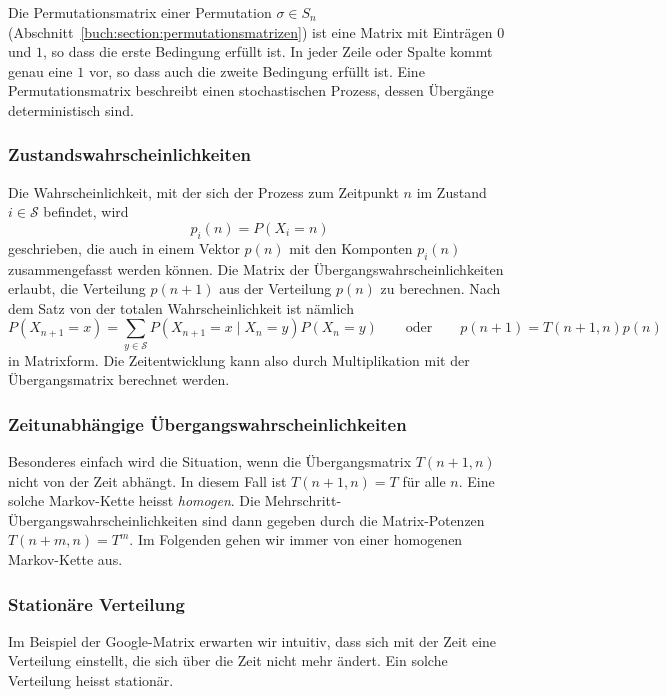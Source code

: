 \begin{beispiel}
Die Permutationsmatrix einer Permutation $\sigma\in S_n$ 
(Abschnitt~\ref{buch:section:permutationsmatrizen})
%
ist eine Matrix mit Einträgen $0$ und $1$, so dass die erste Bedingung
erfüllt ist.
In jeder Zeile oder Spalte kommt genau eine $1$ vor, so dass auch die
zweite Bedingung erfüllt ist.
Eine Permutationsmatrix beschreibt einen stochastischen Prozess, dessen
Übergänge deterministisch sind.
\end{beispiel}

\subsubsection{Zustandswahrscheinlichkeiten}
Die Wahrscheinlichkeit, mit der sich der Prozess zum Zeitpunkt $n$
im Zustand $i\in\mathcal{S}$ befindet, wird
\[
p_i(n)
=
P(X_i=n)
\]
geschrieben, die auch in einem Vektor $p(n)$ mit den Komponten
$p_i(n)$ zusammengefasst werden können.
Die Matrix der Übergangswahrscheinlichkeiten erlaubt, die Verteilung
$p(n+1)$ aus der Verteilung $p(n)$ zu berechnen.
Nach dem Satz von der totalen Wahrscheinlichkeit ist nämlich
\[
P(X_{n+1}=x)
=
\sum_{y\in\mathcal{S}} 
P(X_{n+1}=x\mid X_n=y) P(X_n=y)
\qquad\text{oder}\qquad
p(n+1) = T(n+1,n) p(n)
\]
in Matrixform.
Die Zeitentwicklung kann also durch Multiplikation mit der Übergangsmatrix
berechnet werden.

\subsubsection{Zeitunabhängige Übergangswahrscheinlichkeiten}
Besonderes einfach wird die Situation, wenn die Übergangsmatrix $T(n+1,n)$
nicht von der Zeit abhängt.
In diesem Fall ist $T(n+1,n) = T$ für alle $n$.
Eine solche Markov-Kette heisst {\em homogen}.
%
Die Mehrschritt-Übergangswahrscheinlichkeiten sind dann gegeben
durch die Matrix-Potenzen $T(n+m,n)=T^m$.
Im Folgenden gehen wir immer von einer homogenen Markov-Kette aus.

\subsubsection{Stationäre Verteilung}
Im Beispiel der Google-Matrix erwarten wir intuitiv, dass sich mit
der Zeit eine Verteilung einstellt,  die sich über die Zeit nicht
mehr ändert.
Ein solche Verteilung heisst stationär.

